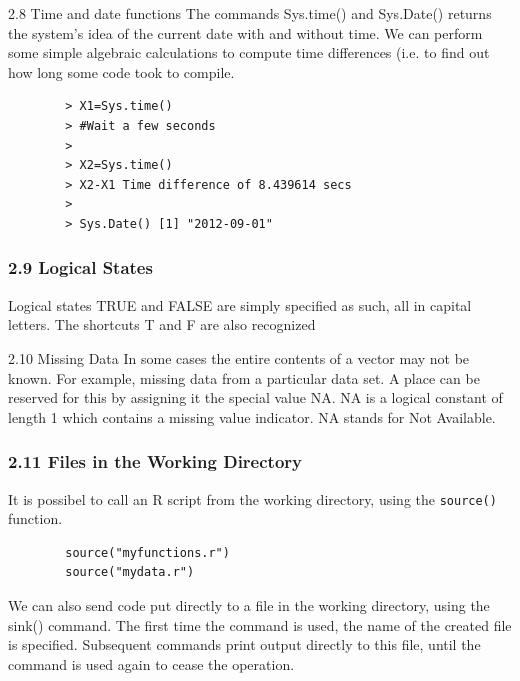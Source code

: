 \documentclass{beamer}
\begin{document}
	\begin{frame}[fragile]
		
		2.8 Time and date functions
		The commands Sys.time() and Sys.Date() returns the system’s idea of the current date
		with and without time. We can perform some simple algebraic calculations to compute time
		differences (i.e. to find out how long some code took to compile.
		
	\end{frame}
	\begin{frame}[fragile]
				
		\begin{verbatim}
		> X1=Sys.time()
		> #Wait a few seconds
		>
		> X2=Sys.time()
		> X2-X1 Time difference of 8.439614 secs
		>
		> Sys.Date() [1] "2012-09-01"
		\end{verbatim}
		\end{frame}
		\begin{frame}	
		\frametitle{2.9 Logical States}
		Logical states TRUE and FALSE are simply specified as such, all in capital letters. The
		shortcuts T and F are also recognized
		
	\end{frame}
	\begin{frame}
		
		
		2.10 Missing Data
		In some cases the entire contents of a vector may not be known. For example, missing data
		from a particular data set. A place can be reserved for this by assigning it the special value
		NA.
		NA is a logical constant of length 1 which contains a missing value indicator. NA stands
		for Not Available.
		
	\end{frame}
	\begin{frame}[fragile]
		
\frametitle{2.11 Files in the Working Directory}
		It is possibel to call an R script from the working directory, using the \texttt{source()} function.
			\begin{framed}
				\begin{verbatim}
		source("myfunctions.r")
		source("mydata.r")
			\end{verbatim}
		\end{framed}	
		We can also send code put directly to a file in the working directory, using the sink()
		command. The first time the command is used, the name of the created file is specified.
		Subsequent commands print output directly to this file, until the command is used again to
		cease the operation.
	\end{frame}
\end{document}
